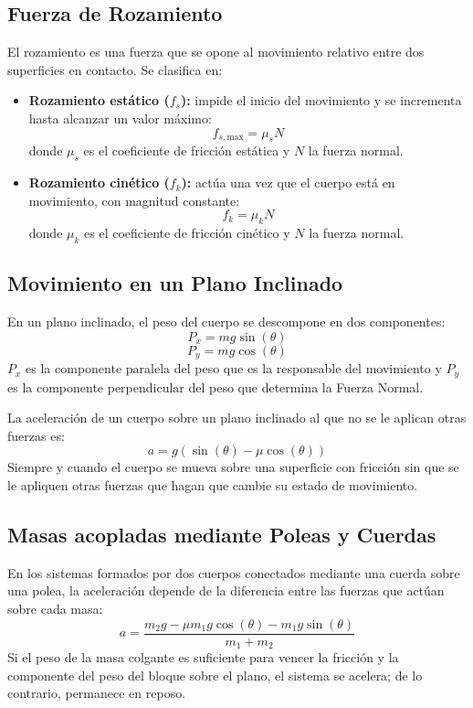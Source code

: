 \documentclass[11pt,a4paper]{article}
\begin{document}
\subsection{Fuerza de Rozamiento}
El rozamiento es una fuerza que se opone al movimiento relativo entre dos superficies en contacto. Se clasifica en:
\begin{itemize}
    \item \textbf{Rozamiento estático ($f_s$):} impide el inicio del movimiento y se incrementa hasta alcanzar un valor máximo:
    \begin{equation}
        f_{s,\text{max}} = \mu_s N
    \end{equation}
    donde $\mu_s$ es el coeficiente de fricción estática y $N$ la fuerza normal.
    \item \textbf{Rozamiento cinético ($f_k$):} actúa una vez que el cuerpo está en movimiento, con magnitud constante:
    \begin{equation}
        f_k = \mu_k N
    \end{equation}
    donde $\mu_k$ es el coeficiente de fricción cinético y $N$ la fuerza normal.
\end{itemize}

\subsection{Movimiento en un Plano Inclinado}
En un plano inclinado, el peso del cuerpo se descompone en dos componentes:
\begin{equation}
    P_x = m g \sin(\theta)
\end{equation}
\begin{equation}
    P_y = m g \cos(\theta)
\end{equation}
$P_x$ es la componente paralela del peso que es la responsable del movimiento y $P_y$ es la componente perpendicular del peso que determina la Fuerza Normal.

La aceleración de un cuerpo sobre un plano inclinado al que no se le aplican otras fuerzas es:
\begin{equation}
    a = g(\sin(\theta) - \mu \cos(\theta))
\end{equation}
Siempre y cuando el cuerpo se mueva sobre una superficie con fricción sin que se le apliquen otras fuerzas que hagan que cambie su estado de movimiento.

\subsection{Masas acopladas mediante Poleas y Cuerdas}
En los sistemas formados por dos cuerpos conectados mediante una cuerda sobre una polea, la aceleración depende de la diferencia entre las fuerzas que actúan sobre cada masa:
\begin{equation}
    a = \frac{m_2 g - \mu m_1 g \cos(\theta) - m_1 g \sin(\theta)}{m_1 + m_2}
\end{equation}
Si el peso de la masa colgante es suficiente para vencer la fricción y la componente del peso del bloque sobre el plano, el sistema se acelera; de lo contrario, permanece en reposo.
\end{document}
